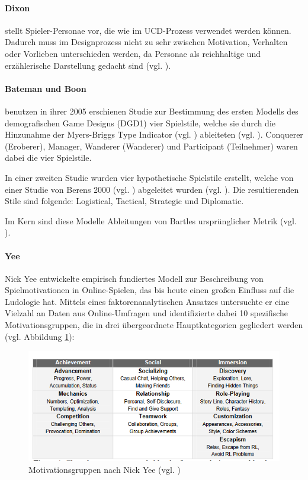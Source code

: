 \paragraph{Dixon} 
stellt Spieler-Personae vor, die wie im \ac{UCD}-Prozess verwendet werden können. Dadurch muss im Designprozess nicht zu sehr zwischen Motivation, Verhalten oder Vorlieben unterschieden werden, da Personae als reichhaltige und erzählerische Darstellung gedacht sind (vgl. \cite{dixon_player_nodate}).

\paragraph{Bateman und Boon}
benutzen in ihrer 2005 erschienen Studie zur Bestimmung des ersten Modells des demografischen Game Designs (DGD1) vier Spielstile, welche sie durch die Hinzunahme der Myers-Briggs Type Indicator (vgl. \cite{noauthor_mbti_nodate}) ableiteten (vgl. \cite{bateman_21st_2005}).
Conquerer (Eroberer), Manager, Wanderer (Wanderer) und Participant (Teilnehmer) waren dabei die vier Spielstile.

In einer zweiten Studie wurden vier hypothetische Spielstile erstellt, welche von einer Studie von Berens 2000 (vgl. \cite{berens_understanding_2000}) abgeleitet wurden (vgl. \cite{bateman_player_2012}). Die resultierenden Stile sind folgende: Logistical, Tactical, Strategic und Diplomatic.

Im Kern sind diese Modelle Ableitungen von Bartles ursprünglicher Metrik (vgl. \cite{ludologie_spielertypen_nodate}).

\paragraph{Yee}
Nick Yee entwickelte empirisch fundiertes Modell zur Beschreibung von Spielmotivationen in Online-Spielen, das bis heute einen großen Einfluss auf die Ludologie hat. Mittels eines faktorenanalytischen Ansatzes untersuchte er eine Vielzahl an Daten aus Online-Umfragen und identifizierte dabei 10 spezifische Motivationsgruppen, die in drei übergeordnete Hauptkategorien gegliedert werden (vgl. Abbildung \ref{fig:nick_yee_motivations}):

\begin{figure}[ht]
\centering
\includegraphics[width=1\linewidth]{content/pictures/nick_yee_categorizations.PNG}
\caption{Motivationsgruppen nach Nick Yee (vgl. \cite{yee_motivations_nodate})}
\label{fig:nick_yee_motivations}
\end{figure}

